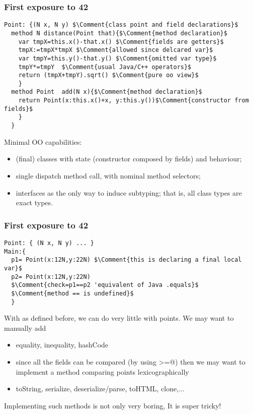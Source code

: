 
\begin{frame}[fragile]
\frametitle{First exposure to 42}
\begin{NiceCode}{59ex}{0.8}
\begin{lstlisting}
Point: {(N x, N y) $\Comment{class point and field declarations}$
  method N distance(Point that){$\Comment{method declaration}$
    var tmpX=this.x()-that.x() $\Comment{fields are getters}$
    tmpX:=tmpX*tmpX $\Comment{allowed since delcared var}$
    var tmpY=this.y()-that.y() $\Comment{omitted var type}$
    tmpY*=tmpY  $\Comment{usual Java/C++ operators}$
    return (tmpX+tmpY).sqrt() $\Comment{pure oo view}$
    }
  method Point  add(N x){$\Comment{method declaration}$
    return Point(x:this.x()+x, y:this.y())$\Comment{constructor from fields}$
    }
  }
\end{lstlisting}
\end{NiceCode}

Minimal OO capabilities:
\begin{itemize}
\item (final) classes with state (constructor composed by fields) and behaviour;
\item single dispatch method call, with nominal method selectors;
\item interfaces as the only way to induce subtyping; that is, all class types are exact types.
\end{itemize}

\end{frame}

\begin{frame}[fragile]
\frametitle{First exposure to 42}
\begin{NiceCode}{59ex}{0.8}
\begin{lstlisting}
Point: { (N x, N y) ... }
Main:{
  p1= Point(x:12N,y:22N) $\Comment{this is declaring a final local var}$
  p2= Point(x:12N,y:22N)
  $\Comment{check=p1==p2 'equivalent of Java .equals}$
  $\Comment{method == is undefined}$
  }
\end{lstlisting}
\end{NiceCode}

With \Q@Point@ as defined before, we can do very little with points.
We may want to manually add
\begin{itemize}
\item equality, inequality, hashCode
\item since all the fields can be compared  (by using \Q@>=@) then
we may want to implement a method comparing points lexicographically
\item toString, serialize, deserialize/parse, toHTML, clone,...
\end{itemize}
Implementing such methods is not only very boring,
\PresentationOnly\pause\alert{It is super tricky!}

\end{frame}

